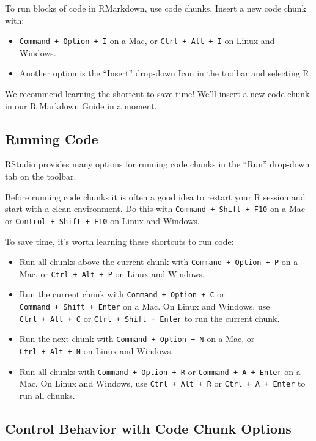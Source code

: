 \documentclass[
]{book}
\providecommand{\tightlist}{%
  \setlength{\itemsep}{0pt}\setlength{\parskip}{0pt}}
\begin{document}
To run blocks of code in RMarkdown, use code chunks. Insert a new code chunk with:

\begin{itemize}
\tightlist
\item
  \texttt{Command\ +\ Option\ +\ I} on a Mac, or \texttt{Ctrl\ +\ Alt\ +\ I} on Linux and Windows.
\item
  Another option is the ``Insert'' drop-down Icon in the toolbar and selecting R.
\end{itemize}

We recommend learning the shortcut to save time! We'll insert a new code chunk in our R Markdown Guide in a moment.

\hypertarget{running-code}{%
\subsection{Running Code}\label{running-code}}

RStudio provides many options for running code chunks in the ``Run'' drop-down tab on the toolbar.

Before running code chunks it is often a good idea to restart your R session and start with a clean environment. Do this with \texttt{Command\ +\ Shift\ +\ F10} on a Mac or \texttt{Control\ +\ Shift\ +\ F10} on Linux and Windows.

To save time, it's worth learning these shortcuts to run code:

\begin{itemize}
\tightlist
\item
  Run all chunks above the current chunk with \texttt{Command\ +\ Option\ +\ P} on a Mac, or \texttt{Ctrl\ +\ Alt\ +\ P} on Linux and Windows.
\item
  Run the current chunk with \texttt{Command\ +\ Option\ +\ C} or \texttt{Command\ +\ Shift\ +\ Enter} on a Mac. On Linux and Windows, use \texttt{Ctrl\ +\ Alt\ +\ C} or \texttt{Ctrl\ +\ Shift\ +\ Enter} to run the current chunk.
\item
  Run the next chunk with \texttt{Command\ +\ Option\ +\ N} on a Mac, or \texttt{Ctrl\ +\ Alt\ +\ N} on Linux and Windows.
\item
  Run all chunks with \texttt{Command\ +\ Option\ +\ R} or \texttt{Command\ +\ A\ +\ Enter} on a Mac. On Linux and Windows, use \texttt{Ctrl\ +\ Alt\ +\ R} or \texttt{Ctrl\ +\ A\ +\ Enter} to run all chunks.
\end{itemize}

\hypertarget{control-behavior-with-code-chunk-options}{%
\subsection{Control Behavior with Code Chunk Options}\label{control-behavior-with-code-chunk-options}}
\end{document}

